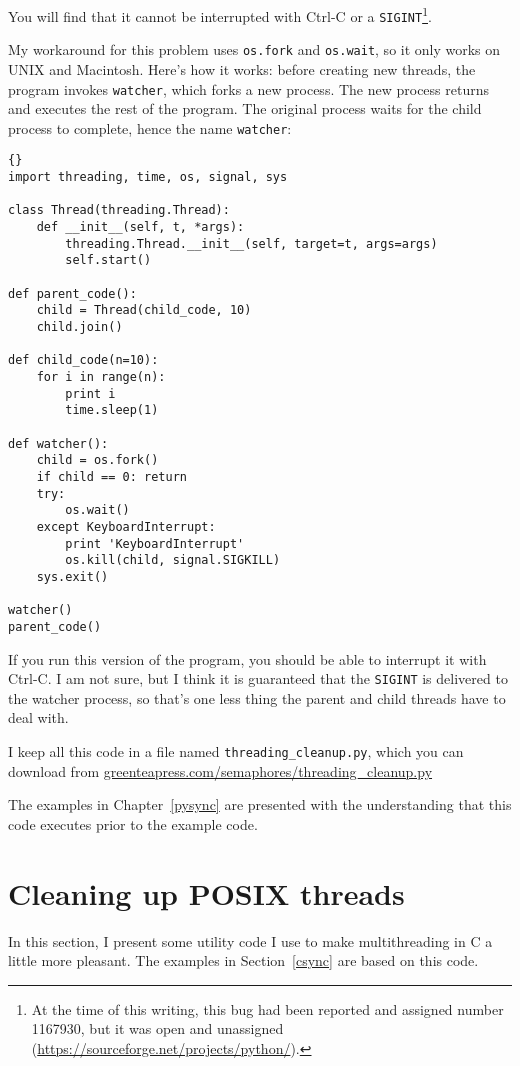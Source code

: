 You will find that it cannot be interrupted with Ctrl-C or
a {\tt SIGINT}\footnote{At the time of this writing, this
bug had been reported and assigned number 1167930, but it was
open and unassigned (\url{https://sourceforge.net/projects/python/}).}.

My workaround for this problem uses {\tt os.fork} and {\tt os.wait},
so it only works on UNIX and Macintosh.  Here's how it works:
before creating new threads, the program invokes {\tt watcher},
which forks a new process.  The new process returns and executes
the rest of the program.  The original process waits for the
child process to complete, hence the name {\tt watcher}:

\begin{lstlisting}[title={The watcher}]{}
import threading, time, os, signal, sys

class Thread(threading.Thread):
    def __init__(self, t, *args):
        threading.Thread.__init__(self, target=t, args=args)
        self.start()

def parent_code():
    child = Thread(child_code, 10)
    child.join()

def child_code(n=10):
    for i in range(n):
        print i
        time.sleep(1)

def watcher():
    child = os.fork()
    if child == 0: return
    try:
        os.wait()
    except KeyboardInterrupt:
        print 'KeyboardInterrupt'
        os.kill(child, signal.SIGKILL)
    sys.exit()

watcher()
parent_code()
\end{lstlisting}

If you run this version of the program, you should be able
to interrupt it with Ctrl-C.  I am not sure, but I think it
is guaranteed that the {\tt SIGINT} is delivered to the
watcher process, so that's one less thing the
parent and child threads have to deal with.

I keep all this code in a file named {\tt threading\_cleanup.py},
which you can download from
\url{greenteapress.com/semaphores/threading\_cleanup.py}


The examples in Chapter~\ref{pysync} are presented with the understanding
that this code executes prior to the example code.


\chapter{Cleaning up POSIX threads}
\label{ccleanup}

In this section, I present some utility code I use to make
multithreading in C a little more pleasant.  The examples in
Section~\ref{csync} are based on this code.

